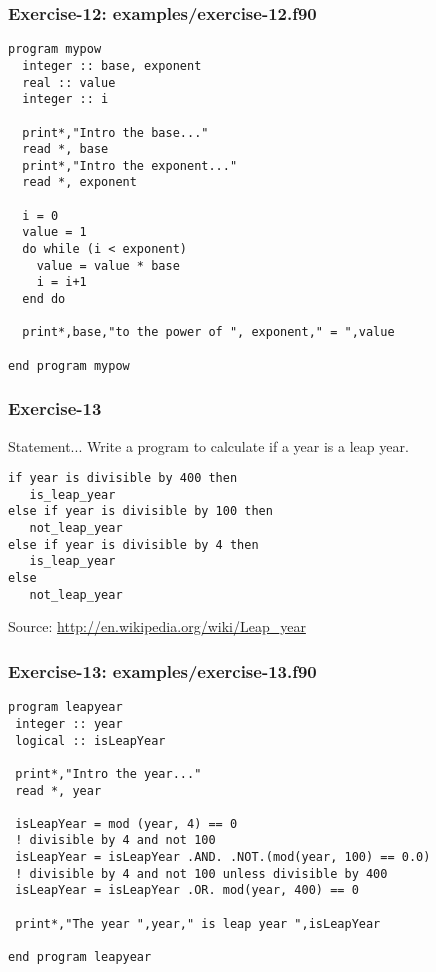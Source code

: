 \documentclass[xcolor=dvipsnames,dvip,notes=show,table]{beamer}
\begin{document}
\begin{frame}[fragile]
\frametitle{Exercise-12: examples/exercise-12.f90}
\tiny
\begin{lstlisting}
program mypow
  integer :: base, exponent
  real :: value
  integer :: i
  
  print*,"Intro the base..."
  read *, base
  print*,"Intro the exponent..."
  read *, exponent
 
  i = 0
  value = 1
  do while (i < exponent) 
    value = value * base
    i = i+1
  end do 

  print*,base,"to the power of ", exponent," = ",value 	
 
end program mypow
\end{lstlisting}
\end{frame}



\begin{frame}[fragile]
\frametitle{Exercise-13}
\begin{block}{Statement...}
 Write a program to calculate if a year is a leap year.
\end{block}
\begin{lstlisting}
if year is divisible by 400 then
   is_leap_year
else if year is divisible by 100 then
   not_leap_year
else if year is divisible by 4 then
   is_leap_year
else
   not_leap_year
\end{lstlisting}

Source: \url{http://en.wikipedia.org/wiki/Leap\_year}
\end{frame}


\begin{frame}[fragile]
\frametitle{Exercise-13: examples/exercise-13.f90}
\scriptsize
\begin{lstlisting}
program leapyear
 integer :: year
 logical :: isLeapYear

 print*,"Intro the year..."
 read *, year

 isLeapYear = mod (year, 4) == 0
 ! divisible by 4 and not 100
 isLeapYear = isLeapYear .AND. .NOT.(mod(year, 100) == 0.0)
 ! divisible by 4 and not 100 unless divisible by 400
 isLeapYear = isLeapYear .OR. mod(year, 400) == 0

 print*,"The year ",year," is leap year ",isLeapYear
 
end program leapyear
\end{lstlisting}
\end{frame}
\end{document}
